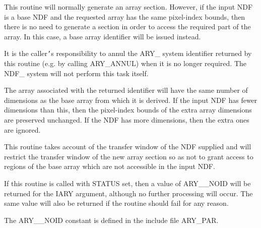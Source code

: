 \documentclass[twoside,11pt]{article}
\newcommand{\hi}[1]{{\tt{#1}}}
\newcommand{\sstitem}{\item}
\newcommand{\sstitem}{\item}
\begin{document}
{{{         \sstitem
         This routine will normally generate an array section. However,
         if the input NDF is a base NDF and the requested array has the
         same pixel-index bounds, then there is no need to generate a
         section in order to access the required part of the array. In
         this case, a base array identifier will be issued instead.

         \sstitem
         It is the caller\hi{'}s responsibility to annul the ARY\_ system
         identifier returned by this routine (e.g. by calling ARY\_ANNUL)
         when it is no longer required. The NDF\_ system will not perform
         this task itself.

         \sstitem
         The array associated with the returned identifier will have
         the same number of dimensions as the base array from which it is
         derived. If the input NDF has fewer dimensions than this, then
         the pixel-index bounds of the extra array dimensions are
         preserved unchanged. If the NDF has more dimensions, then the
         extra ones are ignored.

         \sstitem
         This routine takes account of the transfer window of the NDF
         supplied and will restrict the transfer window of the new array
         section so as not to grant access to regions of the base array
         which are not accessible in the input NDF.

         \sstitem
         If this routine is called with STATUS set, then a value of
         ARY\_\_NOID will be returned for the IARY argument, although no
         further processing will occur. The same value will also be
         returned if the routine should fail for any reason.

         \sstitem
         The ARY\_\_NOID constant is defined in the include file ARY\_PAR.
      }
   }
}
\end{document}
